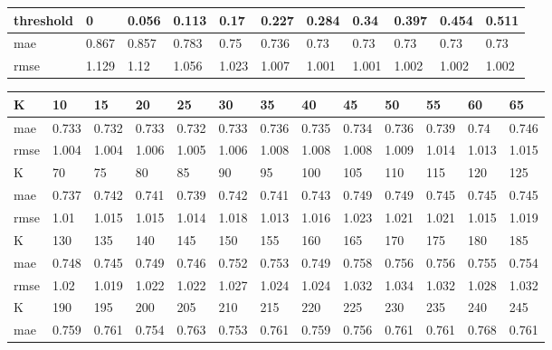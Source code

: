 \begin{appendices}
\begin{center}\label{tab17}
	\begin{tabularx}{\textwidth}{|l|X|X|X|X|X|X|X|X|X|X|}
		\hline
		threshold & 0 & 0.056 & 0.113 & 0.17 & 0.227 & 0.284 & 0.34 & 0.397 & 0.454 & 0.511 \\ \hline
		mae & 0.867 & 0.857 & 0.783 & 0.75 & 0.736 & 0.73 & 0.73 & 0.73 & 0.73 & 0.73 \\ \hline
		rmse & 1.129 & 1.12 & 1.056 & 1.023 & 1.007 & 1.001 & 1.001 & 1.002 & 1.002 & 1.002 \\ \hline
	\end{tabularx}	
\end{center}



\begin{center} \label{tab18}
	\begin{tabularx}{\textwidth}{|l|X|X|X|X|X|X|X|X|X|X|X|X|} 
		\hline 
		K & 10 & 15 & 20 & 25 & 30 & 35 & 40 & 45 & 50 & 55 & 60 & 65 \\ \hline 
		mae & 0.733 & 0.732 & 0.733 & 0.732 & 0.733 & 0.736 & 0.735 & 0.734 & 0.736 & 0.739 & 0.74 & 0.746 \\ \hline 
		rmse & 1.004 & 1.004 & 1.006 & 1.005 & 1.006 & 1.008 & 1.008 & 1.008 & 1.009 & 1.014 & 1.013 & 1.015 \\ \hline 
		\hline 
		K & 70 & 75 & 80 & 85 & 90 & 95 & 100 & 105 & 110 & 115 & 120 & 125 \\ \hline 
		mae & 0.737 & 0.742 & 0.741 & 0.739 & 0.742 & 0.741 & 0.743 & 0.749 & 0.749 & 0.745 & 0.745 & 0.745 \\ \hline 
		rmse & 1.01 & 1.015 & 1.015 & 1.014 & 1.018 & 1.013 & 1.016 & 1.023 & 1.021 & 1.021 & 1.015 & 1.019 \\ \hline 
		\hline 
		K & 130 & 135 & 140 & 145 & 150 & 155 & 160 & 165 & 170 & 175 & 180 & 185 \\ \hline 
		mae & 0.748 & 0.745 & 0.749 & 0.746 & 0.752 & 0.753 & 0.749 & 0.758 & 0.756 & 0.756 & 0.755 & 0.754 \\ \hline 
		rmse & 1.02 & 1.019 & 1.022 & 1.022 & 1.027 & 1.024 & 1.024 & 1.032 & 1.034 & 1.032 & 1.028 & 1.032 \\ \hline 
		\hline 
		K & 190 & 195 & 200 & 205 & 210 & 215 & 220 & 225 & 230 & 235 & 240 & 245 \\ \hline 
		mae & 0.759 & 0.761 & 0.754 & 0.763 & 0.753 & 0.761 & 0.759 & 0.756 & 0.761 & 0.761 & 0.768 & 0.761 \\ \hline 

\end{tabularx}
\end{center}
\end{appendices}
